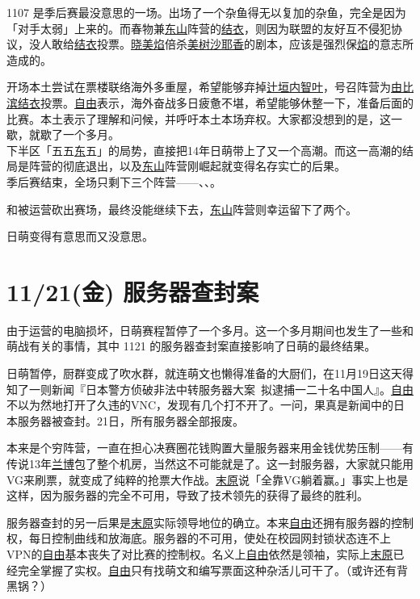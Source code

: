 1107 是季后赛最没意思的一场。出场了一个杂鱼得无以复加的杂鱼，完全是因为「对手太弱」上来的。而春物兼\uline{东山}阵营的\uline{结衣}，则因为联盟的友好互不侵犯协议，没人敢给\uline{结衣}投票。\uline{晓美焰}倍杀\uline{美树沙耶香}的剧本，应该是强烈保\uline{焰}的意志所造成的。

开场本土尝试在票楼联络海外多重屋，希望能够弃掉\uline{辻垣内智叶}，号召阵营为\uline{由比滨结衣}投票。\uline{自由}表示，海外奋战多日疲惫不堪，希望能够休整一下，准备后面的比赛。本土表示了理解和问候，并呼吁本土本场弃权。大家都没想到的是，这一歇，就歇了一个多月。
\\

下半区「五五\uline{东}五」的局势，直接把14年日萌带上了又一个高潮。而这一高潮的结局是阵营的彻底退出，以及\uline{东山}阵营刚崛起就变得名存实亡的后果。
\\[1em]

季后赛结束，全场只剩下三个阵营——、、。

和被运营砍出赛场，最终没能继续下去，\uline{东山}阵营则幸运留下了两个。

日萌变得有意思而又没意思。
\clearpage
\section{11/21(金) 服务器查封案}

由于运营的电脑损坏，日萌赛程暂停了一个多月。这一个多月期间也发生了一些和萌战有关的事情，其中 1121 的服务器查封案直接影响了日萌的最终结果。

日萌暂停，厨群变成了吹水群，就连萌文也懒得准备的大厨们，在11月19日这天得知了一则新闻『日本警方侦破非法中转服务器大案~拟逮捕一二十名中国人』。\uline{自由}不以为然地打开了久违的VNC，发现有几个打不开了。一问，果真是新闻中的日本服务器被查封。21日，所有服务器全部报废。

本来是个穷阵营，一直在担心决赛圈花钱购置大量服务器来用金钱优势压制——有传说13年\uline{兰博}包了整个机房，当然这不可能就是了。这一封服务器，大家就只能用VG来刷票，就变成了纯粹的抢票大作战。\uline{末原}说「全靠VG躺着赢。」事实上也是这样，因为服务器的完全不可用，导致了技术领先的获得了最终的胜利。

服务器查封的另一后果是\uline{末原}实际领导地位的确立。本来\uline{自由}还拥有服务器的控制权，每日控制曲线和放海底。服务器的不可用，使处在校园网封锁状态连不上VPN的\uline{自由}基本丧失了对比赛的控制权。名义上\uline{自由}依然是领袖，实际上\uline{末原}已经完全掌握了实权。\uline{自由}只有找萌文和编写票面这种杂活儿可干了。（或许还有背黑锅？）

